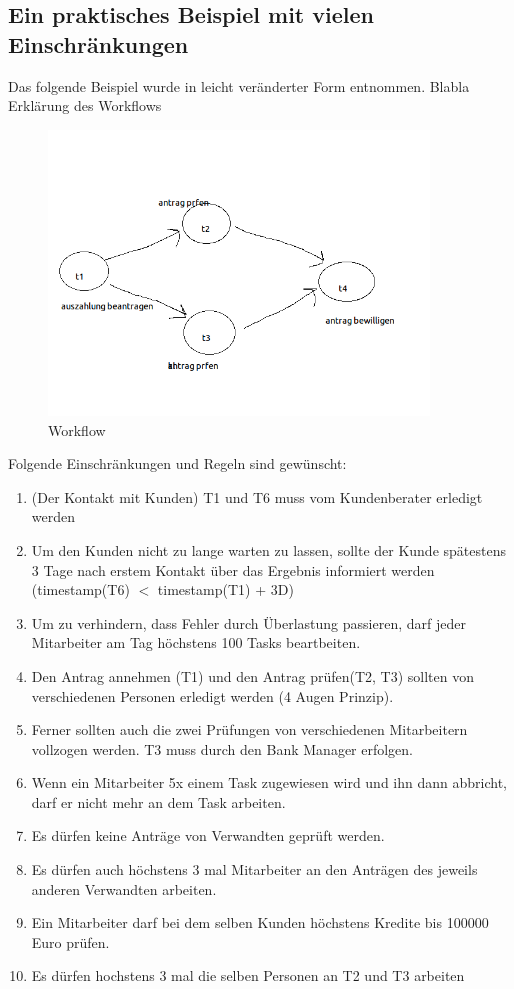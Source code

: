 \subsection{Ein praktisches Beispiel mit vielen Einschränkungen}
Das folgende Beispiel wurde in leicht veränderter Form \cite{wolter_modeling_of_TBAC_in_BPMN} entnommen.
 Blabla Erklärung des Workflows
\begin{figure}[ht]
	\centering
  \includegraphics[width=0.9\textwidth]{Figures/Workflow}
	\caption{Workflow}
	\label{fig:Workflow}
\end{figure}
 Folgende Einschränkungen und Regeln sind gewünscht:\\

\begin{enumerate}
\item (Der Kontakt mit Kunden) T1 und T6 muss vom Kundenberater erledigt werden
\item Um den Kunden nicht zu lange warten zu lassen, sollte der Kunde spätestens 3 Tage nach erstem Kontakt über das Ergebnis informiert werden (timestamp(T6) $<$ timestamp(T1) + 3D)
\item Um zu verhindern, dass Fehler durch Überlastung passieren, darf jeder Mitarbeiter am Tag höchstens 100 Tasks beartbeiten.
\item Den Antrag annehmen (T1) und den Antrag prüfen(T2, T3) sollten von verschiedenen Personen erledigt werden (4 Augen Prinzip).
\item Ferner sollten auch die zwei Prüfungen von verschiedenen Mitarbeitern vollzogen werden. T3 muss durch den Bank Manager erfolgen.
\item Wenn ein Mitarbeiter 5x einem Task zugewiesen wird und ihn dann abbricht, darf er nicht mehr an dem Task arbeiten.
\item Es dürfen keine Anträge von Verwandten geprüft werden.
\item Es dürfen auch höchstens 3 mal Mitarbeiter an den Anträgen des jeweils anderen Verwandten arbeiten.
\item Ein Mitarbeiter darf bei dem selben Kunden höchstens Kredite bis 100000 Euro prüfen.
\item Es dürfen hochstens 3 mal die selben Personen an T2 und T3 arbeiten
\end{enumerate}


